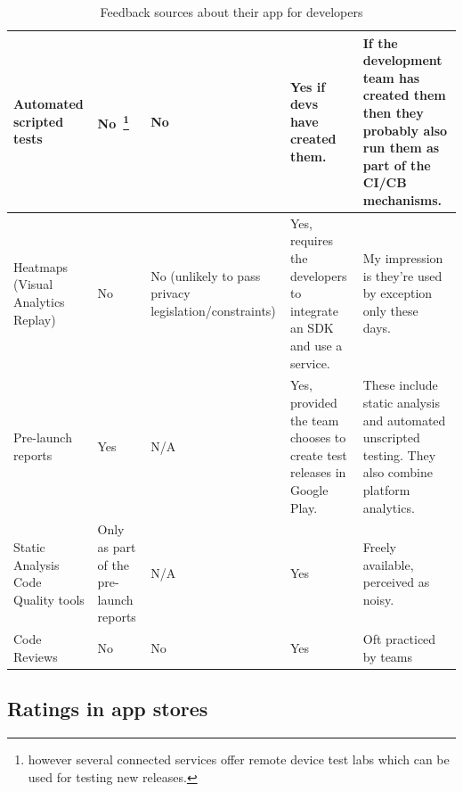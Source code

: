\begin{table}[H]
\begin{tabular}{L{2cm} L{2.4cm} L{3.5cm} L{2.4cm} L{3.5cm}}
		Automated scripted tests  & No~\footnote{however several connected services offer remote device test labs which can be used for testing new releases.} & No & Yes if devs have created them. & If the development team has created them then they probably also run them as part of the CI/CB mechanisms. \\ \midrule
		Heatmaps (Visual Analytics Replay) & No & No (unlikely to pass privacy legislation/constraints) & Yes, requires the developers to integrate an SDK and use a service. & My impression is they’re used by exception only these days. \\ \midrule
		Pre-launch reports & Yes & N/A & Yes, provided the team chooses to create test releases in Google Play. & These include static analysis and automated unscripted testing. They also combine platform analytics. \\ \midrule
		Static Analysis Code Quality tools & Only as part of the pre-launch reports & N/A & Yes & Freely available, perceived as noisy. \\ \midrule
		Code Reviews & No & No & Yes & Oft practiced by teams \\
		\bottomrule
	\end{tabular}
	\caption{Feedback sources about their app for developers}
	\label{tab:feedback-sources-about-their-app-for-devs}
\end{table}


\vspace{2\baselineskip}


\subsection{Ratings in app stores}


